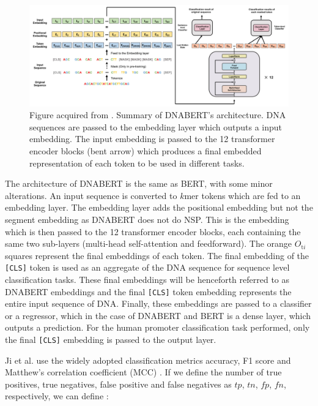 \documentclass{article}
\begin{document}
\begin{figure}[H]
    \centering
    \includegraphics[width=1\linewidth]{images/dnabert.jpg}
    \caption{Figure acquired from \cite{dnabert2020}. Summary of DNABERT's architecture. DNA sequences are passed to the embedding layer which outputs a input embedding. The input embedding is passed to the 12 transformer encoder blocks (bent arrow) which produces a final embedded representation of each token to be used in different tasks.}
    \label{fig:dnabert}
\end{figure}

The architecture of DNABERT is the same as BERT, with some minor alterations. An input sequence is converted to $k$mer tokens which are fed to an embedding layer. The embedding layer adds the positional embedding but not the segment embedding as DNABERT does not do NSP. This is the embedding which is then passed to the 12 transformer encoder blocks, each containing the same two sub-layers (multi-head self-attention and feedforward). The orange $O_{\textrm{t}i}$ squares represent the final embeddings of each token. The final embedding of the \texttt{[CLS]} token is used as an aggregate of the DNA sequence for sequence level classification tasks. These final embeddings will be henceforth referred to as DNABERT embeddings and the final \texttt{[CLS]} token embedding represents the entire input sequence of DNA. Finally, these embeddings are passed to a classifier or a regressor, which in the case of DNABERT and BERT is a dense layer, which outputs a prediction. For the human promoter classification task performed, only the final \texttt{[CLS]} embedding is passed to the output layer. 

Ji et al. \cite{dnabert2020} use the widely adopted classification metrics accuracy, F1 score and Matthew's correlation coefficient (MCC) \cite{oubounyt2019dee}. If we define the number of true positives, true negatives, false positive and false negatives as $tp$, $tn$, $fp$, $fn$, respectively, we can define \cite{scikit-learn, oubounyt2019dee}:
\end{document}
